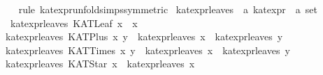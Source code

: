 \begin{isabellebody}
%
\isadelimproof
\ \ %
\endisadelimproof
%
\isatagproof
{}\isamarkupfalse%
\ {}rule\ kat{}expr{}unfold{}simps{}{}{}{}symmetric{}{}%
\endisatagproof
{\isafoldproof}%
%
\isadelimproof
\isanewline
%
\endisadelimproof
\isanewline
{}\isamarkupfalse%
\ kat{}expr{}leaves\ {}{}\ {}{}a\ kat{}expr\ {}\ {}a\ set{}\ \isanewline
\ \ {}kat{}expr{}leaves\ {}KATLeaf\ x{}\ {}\ {}x{}{}\isanewline
{}\ {}kat{}expr{}leaves\ {}KATPlus\ x\ y{}\ {}\ kat{}expr{}leaves\ x\ {}\ kat{}expr{}leaves\ y{}\isanewline
{}\ {}kat{}expr{}leaves\ {}KATTimes\ x\ y{}\ {}\ kat{}expr{}leaves\ x\ {}\ kat{}expr{}leaves\ y{}\isanewline
{}\ {}kat{}expr{}leaves\ {}KATStar\ x{}\ {}\ kat{}expr{}leaves\ x{}\isanewline

\end{isabellebody}
